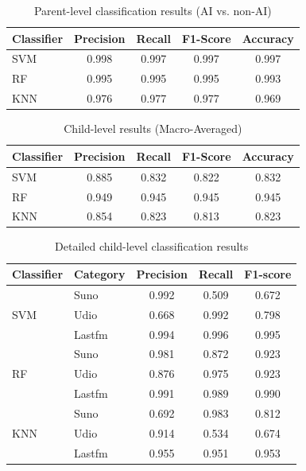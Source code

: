 \begin{table}[ht]\centering\begin{tabular}{lcccc}\hline
Classifier & Precision & Recall & F1-Score & Accuracy \\ \hline
SVM & 0.998 & 0.997 & 0.997 & 0.997 \\ \hline 
RF & 0.995 & 0.995 & 0.995 & 0.993 \\ \hline 
KNN & 0.976 & 0.977 & 0.977 & 0.969 \\ \hline 
\end{tabular}\caption{Parent-level classification results (AI vs. non-AI)}\label{tab:parent_results}\end{table}
\begin{table}[ht]\centering\begin{tabular}{lcccc}\hline
Classifier & Precision & Recall & F1-Score & Accuracy \\ \hline
SVM & 0.885 & 0.832 & 0.822 & 0.832 \\ \hline 
RF & 0.949 & 0.945 & 0.945 & 0.945 \\ \hline 
KNN & 0.854 & 0.823 & 0.813 & 0.823 \\ \hline 
\end{tabular}\caption{Child-level results (Macro-Averaged)}\label{tab:child_macro}\end{table}
\begin{table}[ht]\centering\begin{tabular}{llccc}\hline
Classifier & Category & Precision & Recall & F1-score \\ \hline
\multirow{3}{*}{SVM} & Suno & 0.992 & 0.509 & 0.672 \\ 
& Udio & 0.668 & 0.992 & 0.798 \\ 
& Lastfm & 0.994 & 0.996 & 0.995 \\ 
\hline 
\multirow{3}{*}{RF} & Suno & 0.981 & 0.872 & 0.923 \\ 
& Udio & 0.876 & 0.975 & 0.923 \\ 
& Lastfm & 0.991 & 0.989 & 0.990 \\ 
\hline 
\multirow{3}{*}{KNN} & Suno & 0.692 & 0.983 & 0.812 \\ 
& Udio & 0.914 & 0.534 & 0.674 \\ 
& Lastfm & 0.955 & 0.951 & 0.953 \\ 
\hline 
\end{tabular}\caption{Detailed child-level classification results}\label{tab:child_detailed}\end{table}